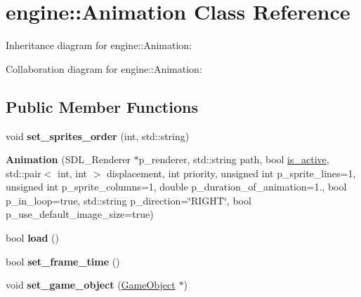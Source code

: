 \hypertarget{classengine_1_1_animation}{}\section{engine\+:\+:Animation Class Reference}
\label{classengine_1_1_animation}


Inheritance diagram for engine\+:\+:Animation\+:


Collaboration diagram for engine\+:\+:Animation\+:
\subsection*{Public Member Functions}
\begin{DoxyCompactItemize}
\item 
void {\bfseries set\+\_\+sprites\+\_\+order} (int, std\+::string)\hypertarget{classengine_1_1_animation_a027ec68d45a5226248c13cd14b1c5f2a}{}\label{classengine_1_1_animation_a027ec68d45a5226248c13cd14b1c5f2a}

\item 
{\bfseries Animation} (S\+D\+L\+\_\+\+Renderer $\ast$p\+\_\+renderer, std\+::string path, bool \hyperlink{classengine_1_1_component_ae1a97027b9862ee3e41e6566501d765e}{is\+\_\+active}, std\+::pair$<$ int, int $>$ displacement, int priority, unsigned int p\+\_\+sprite\+\_\+lines=1, unsigned int p\+\_\+sprite\+\_\+columns=1, double p\+\_\+duration\+\_\+of\+\_\+animation=1., bool p\+\_\+in\+\_\+loop=true, std\+::string p\+\_\+direction=\char`\"{}R\+I\+G\+HT\char`\"{}, bool p\+\_\+use\+\_\+default\+\_\+image\+\_\+size=true)\hypertarget{classengine_1_1_animation_aa2cfdba04398181a816a77ee27d46868}{}\label{classengine_1_1_animation_aa2cfdba04398181a816a77ee27d46868}

\item 
bool {\bfseries load} ()\hypertarget{classengine_1_1_animation_a1c98b3767d4c63f9ef080fbaf913b06c}{}\label{classengine_1_1_animation_a1c98b3767d4c63f9ef080fbaf913b06c}

\item 
bool {\bfseries set\+\_\+frame\+\_\+time} ()\hypertarget{classengine_1_1_animation_a419f0c0142e424ea4b65d5f5f0442c8e}{}\label{classengine_1_1_animation_a419f0c0142e424ea4b65d5f5f0442c8e}

\item 
void {\bfseries set\+\_\+game\+\_\+object} (\hyperlink{classengine_1_1_game_object}{Game\+Object} $\ast$)\hypertarget{classengine_1_1_animation_a8c2c7a2d4f9053429910acca480fcb99}{}\label{classengine_1_1_animation_a8c2c7a2d4f9053429910acca480fcb99}


\end{DoxyCompactItemize}
